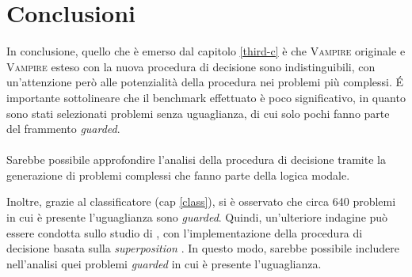 \chapter{Conclusioni}\label{fourth-c}
In conclusione, quello che è emerso dal capitolo \ref{third-c} è che 
\textsc{Vampire} originale e \textsc{Vampire} esteso con la nuova procedura di decisione sono indistinguibili,
con un'attenzione però alle potenzialità della procedura nei problemi più complessi. 
\'E importante sottolineare che il benchmark effettuato 
è poco significativo, in quanto sono stati selezionati problemi senza uguaglianza, di cui solo
pochi fanno parte del frammento \emph{guarded}.\\\\
Sarebbe possibile approfondire l'analisi della procedura di decisione tramite la generazione di problemi complessi che fanno 
parte della logica modale. 

Inoltre, grazie al classificatore (cap \ref{class}), si è osservato che circa 640 problemi in cui è presente l'uguaglianza sono \emph{guarded}. 
Quindi, un'ulteriore indagine può essere condotta sullo studio di \citeauthor{ganzinger1999superposition}, con l'implementazione della 
procedura di decisione basata sulla \emph{superposition} \cite{ganzinger1999superposition}. In questo modo, sarebbe possibile 
includere nell'analisi quei problemi \emph{guarded} in cui è presente l'uguaglianza. 